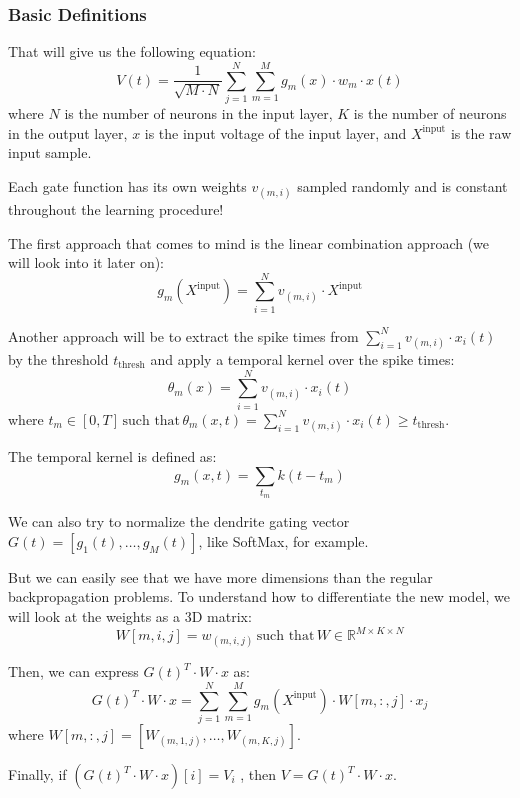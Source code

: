 \subsubsection{Basic Definitions}

That will give us the following equation:
\begin{equation}
V(t) = \frac{1}{\sqrt{M \cdot N}} \sum_{j=1}^{N} \sum_{m=1}^{M} g_m (x) \cdot w_m \cdot x(t)
\end{equation}
where $N$ is the number of neurons in the input layer, $K$ is the number of neurons in the output layer, $x$ is the input voltage of the input layer, and $X^\text{input}$ is the raw input sample.

Each gate function has its own weights $v_{(m,i)}$ sampled randomly and is constant throughout the learning procedure!

The first approach that comes to mind is the linear combination approach (we will look into it later on):
\begin{equation}
g_m (X^\text{input}) = \sum_{i=1}^{N} v_{(m,i)} \cdot X^\text{input}
\end{equation}

Another approach will be to extract the spike times from $\sum_{i=1}^{N} v_{(m,i)} \cdot x_i (t)$ by the threshold $t_\text{thresh}$ and apply a temporal kernel over the spike times:
\begin{equation}
\theta_m (x) = \sum_{i=1}^{N} v_{(m,i)} \cdot x_i (t)
\end{equation}
where $t_m \in [0,T] \, \text{such that} \, \theta_m (x,t) = \sum_{i=1}^{N} v_{(m,i)} \cdot x_i (t) \geq t_\text{thresh}$.

The temporal kernel is defined as:
\begin{equation}
g_m (x,t) = \sum_{t_m} k(t - t_m)
\end{equation}

We can also try to normalize the dendrite gating vector $G(t) = [g_1 (t), \ldots, g_M (t)]$, like SoftMax, for example.

But we can easily see that we have more dimensions than the regular backpropagation problems. To understand how to differentiate the new model, we will look at the weights as a 3D matrix:
\begin{equation}
W[m,i,j] = w_{(m,i,j)} \, \text{such that} \, W \in \mathbb{R}^{M \times K \times N}
\end{equation}

Then, we can express $G(t)^T \cdot W \cdot x$ as:
\begin{equation}
G(t)^T \cdot W \cdot x = \sum_{j=1}^{N} \sum_{m=1}^{M} g_m (X^\text{input}) \cdot W[m,:,j] \cdot x_j
\end{equation}
where $W[m,:,j] = [W_{(m,1,j)}, \ldots, W_{(m,K,j)}]$.

Finally, if $(G(t)^T \cdot W \cdot x)[i] = V_i$ ,  then $V = G(t)^T \cdot W \cdot x$.
